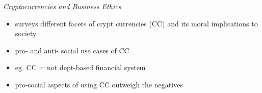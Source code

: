 \begin{frame}
    \frametitle{\insertsection}
    \emph{Cryptocurrencies and Business Ethics}~\cite{cryptoEthics2016}
    \vspace{1em}
    \begin{itemize}
        \itemsep\setlength{.8em}
        \item surveys different facets of crypt currencies (CC) and its moral implications to society
        \item pro- and anti- social use cases of CC
        \item eg. CC = not dept-based financial system
        \item pro-social aspects of using CC outweigh the negatives
    \end{itemize}
\end{frame}